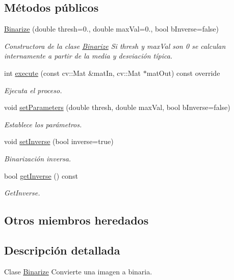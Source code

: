 \subsection*{Métodos públicos}
\begin{DoxyCompactItemize}
\item 
\hyperlink{class_i3_d_1_1_binarize_a1c91d13b3c1ce63366da49291cbac5c7}{Binarize} (double thresh=0., double max\+Val=0., bool b\+Inverse=false)
\begin{DoxyCompactList}\small\item\em Constructora de la clase \hyperlink{class_i3_d_1_1_binarize}{Binarize} Si thresh y max\+Val son 0 se calculan internamente a partir de la media y desviación típica. \end{DoxyCompactList}\item 
int \hyperlink{class_i3_d_1_1_binarize_a2630da33f5cc1c9fe80c991ffd84f613}{execute} (const cv\+::\+Mat \&mat\+In, cv\+::\+Mat $\ast$mat\+Out) const  override
\begin{DoxyCompactList}\small\item\em Ejecuta el proceso. \end{DoxyCompactList}\item 
void \hyperlink{class_i3_d_1_1_binarize_aa598d2d5cdc271fdb2f395c0c76fd012}{set\+Parameters} (double thresh, double max\+Val, bool b\+Inverse=false)
\begin{DoxyCompactList}\small\item\em Establece los parámetros. \end{DoxyCompactList}\item 
void \hyperlink{class_i3_d_1_1_binarize_a0c8b496fa8e2f0558f5ab15937c0e69c}{set\+Inverse} (bool inverse=true)
\begin{DoxyCompactList}\small\item\em Binarización inversa. \end{DoxyCompactList}\item 
bool \hyperlink{class_i3_d_1_1_binarize_a7061a766fd5495aee6301965791f92c3}{get\+Inverse} () const 
\begin{DoxyCompactList}\small\item\em Get\+Inverse. \end{DoxyCompactList}\end{DoxyCompactItemize}
\subsection*{Otros miembros heredados}


\subsection{Descripción detallada}
Clase \hyperlink{class_i3_d_1_1_binarize}{Binarize} Convierte una imagen a binaria. 

